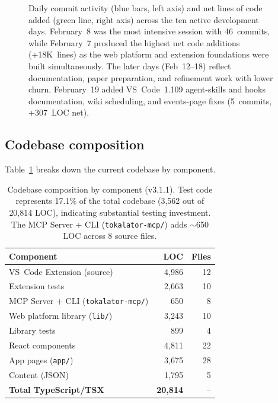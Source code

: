 \documentclass[a4paper,fleqn]{cas-dc}
\begin{document}
\begin{figure}[htp!]
\begin{tikzpicture}[
  bar/.style={fill=extblue!70, draw=extblue, line width=0.4pt},
  addbar/.style={fill=webgreen!60, draw=webgreen!80, line width=0.4pt},
]
\end{tikzpicture}
\caption{Daily commit activity (blue bars, left axis) and net lines of code added (green line, right axis) across the ten active development days. February~8 was the most intensive session with 46~commits, while February~7 produced the highest net code additions (+18K~lines) as the web platform and extension foundations were built simultaneously. The later days (Feb~12--18) reflect documentation, paper preparation, and refinement work with lower churn. February~19 added VS~Code~1.109 agent-skills and hooks documentation, wiki scheduling, and events-page fixes (5~commits, +307~LOC net).}
\label{fig:commits}
\end{figure}



\subsection{Codebase composition}

Table~\ref{tab:codebase} breaks down the current codebase by component.

\begin{table}[htp!]
\centering
\small
\begin{tabular}{|l|r|r|}
\hline
\textbf{Component} & \textbf{LOC} & \textbf{Files} \\
\hline
VS~Code Extension (source) & 4,986 & 12 \\
\hline
Extension tests & 2,663 & 10 \\
\hline
MCP Server + CLI (\texttt{tokalator-mcp/}) & 650 & 8 \\
\hline
Web platform library (\texttt{lib/}) & 3,243 & 10 \\
\hline
Library tests & 899 & 4 \\
\hline
React components & 4,811 & 22 \\
\hline
App pages (\texttt{app/}) & 3,675 & 28 \\
\hline
Content (JSON) & 1,795 & 5 \\
\hline
\textbf{Total TypeScript/TSX} & \textbf{20,814} & -- \\
\hline
\end{tabular}
\caption{Codebase composition by component (v3.1.1). Test code represents 17.1\% of the total codebase (3,562 out of 20,814 LOC), indicating substantial testing investment. The MCP Server + CLI (\texttt{tokalator-mcp/}) adds $\sim$650 LOC across 8 source files.}
\label{tab:codebase}
\end{table}
\end{document}
